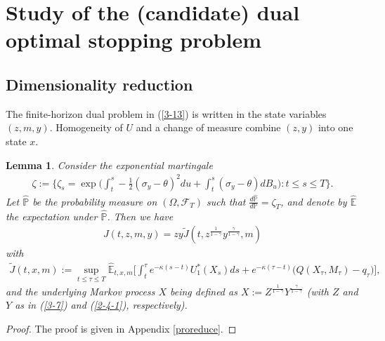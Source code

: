 \documentclass[a4paper,11pt]{amsart}
\numberwithin{equation}{section}
\newtheorem{lemma}{Lemma}[section]
\begin{document}






\section{Study of the (candidate) dual optimal stopping problem}\label{sec4}
\subsection{Dimensionality reduction}

{The finite-horizon dual problem in (\ref{3-13}) is written in the state variables $(z,m,y)$. Homogeneity of $U$ and a change of measure combine $(z,y)$ into one state $x$.}

\begin{lemma}\label{reduce}
Consider the exponential martingale
\begin{align*}
\zeta := \bigg\{ \zeta_s = \exp\bigg(\int^s_t -\frac{1}{2}(\sigma_y-\theta)^2du+\int^s_t (\sigma_y-\theta)dB_u \bigg):  t\leq s \leq T                          \bigg\}.
\end{align*}
Let $\widehat{\mathbb{P}}$ be the probability measure on $(\Omega, \mathcal{F}_T)$ such that $\frac{d\widehat{\mathbb{P}}}{d \mathbb{P}}= \zeta_T$, and denote by $\widehat{\mathbb{E}}$ the expectation under $\widehat{\mathbb{P}}$. Then we have 
\begin{align}\label{jandj}
	J(t,z,m,y)=zy \widetilde{J}(t,z^{\frac{1}{1-\gamma}}y^{\frac{\gamma}{1-\gamma}},m)\end{align} 
with
\begin{align}\label{4-2}
\widetilde{J}(t,x,m):=\sup_{t \leq \tau \leq T
} \widehat{\mathbb{E}}_{t,x,m}\bigg[    \int_t^{\tau }  e^{-\kappa(s-t)} {U}^\ast_1(X_s) ds+ e^{-\kappa(\tau-t)}  \Big(Q(X_\tau, M_\tau)- q_\tau \Big)\bigg],
\end{align}
and the underlying Markov process $X$ being defined as $ X:=Z^{\frac{1}{1-\gamma}}Y^{\frac{\gamma}{1-\gamma}}$ (with $Z$ and $Y$ as in (\ref{3-7}) and (\ref{2-4-1}), respectively).
\end{lemma}
 \begin{proof}
The proof is given in Appendix \ref{proreduce}.
\end{proof}
\end{document}
